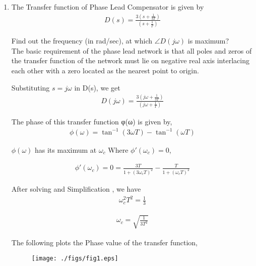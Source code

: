 \begin{enumerate}[label=\thesection.\arabic*.,ref=\thesection.\theenumi]
\item 
The Transfer function of Phase Lead Compensator is given by \\

\begin{align}
D(s) = \frac{3(s+\frac{1}{3T})}{(s+\frac{1}{T})}
\end{align}

Find out the frequency (in rad/sec), at which $\angle D(j\omega)$ is maximum? \\

\solution
The basic requirement of the phase lead network is that all poles and zeros
of the transfer function of the network must lie on negative real axis
interlacing each other with a zero located as the nearest point to origin.

Substituting $s = j\omega$ in D(s), we get \\

\begin{align}
D(j\omega) = \frac{3(j\omega+\frac{1}{3T})}{(j\omega+\frac{1}{T})}
\end{align}

The phase of this transfer function φ(ω) is given by,
\begin{align}
\phi(\omega) = \tan^{-1}(3\omega T)-\tan^{-1}(\omega T)
\end{align}

$\phi(\omega)$ has its maximum at $\omega_c$ Where $\phi '(\omega_c)=0$,

\begin{align}
\phi '(\omega_c) = 0 = \frac{3T}{1+(3\omega _c T)^2}-\frac{T}{1+(\omega _c T)^2}
\end{align}

After solving and Simplification , we have \\

\begin{align}
\omega _c ^2T^2 = \frac{1}{3}
\end{align}

\begin{align}
\omega _c = \sqrt{\frac{1}{3T^2}}
\end{align}

The following plots the Phase value of the transfer function, 

\begin{figure}[htp]
	\centering
	\texttt{[image: ./figs/fig1.eps]}
	\caption{}
	\label{fig:Phase}
\end{figure} 
\end{enumerate}